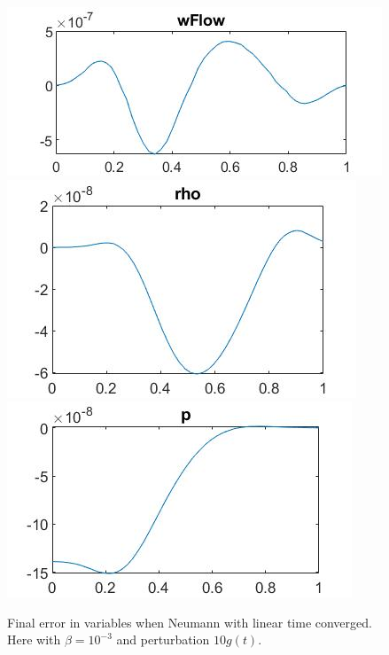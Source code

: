 \documentclass[11pt, a4paper]{article}
\theoremstyle{definition}
\begin{document}
\begin{figure}[h]
	\includegraphics[scale=0.35]{linNfin1.jpg}
	\includegraphics[scale=0.35]{linNfin2.jpg}
	\includegraphics[scale=0.35]{linNfin3.jpg}
	\caption{Final error in variables when Neumann with linear time converged. Here with $\beta =10^{-3}$ and perturbation $10g(t)$.}
	\label{Figlint3}
\end{figure}
\end{document}
